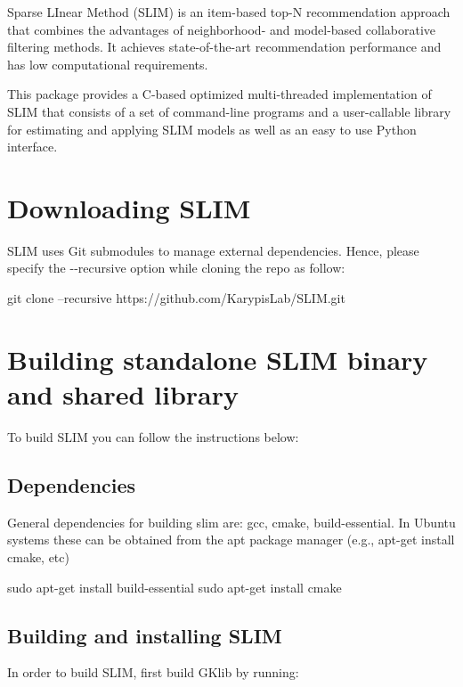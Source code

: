 Sparse L\+Inear Method (S\+L\+IM) \cite{ning2011slim} is an item-\/based top-\/N recommendation approach that combines the advantages of neighborhood-\/ and model-\/based collaborative filtering methods. It achieves state-\/of-\/the-\/art recommendation performance and has low computational requirements.

This package provides a C-\/based optimized multi-\/threaded implementation of S\+L\+IM that consists of a set of command-\/line programs and a user-\/callable library for estimating and applying S\+L\+IM models as well as an easy to use Python interface.



 \hypertarget{index_download}{}\section{Downloading S\+L\+IM}\label{index_download}
S\+L\+IM uses Git submodules to manage external dependencies. Hence, please specify the {\ttfamily -\/-\/recursive} option while cloning the repo as follow\+: 
\begin{DoxyCode}
git clone --recursive https://github.com/KarypisLab/SLIM.git
\end{DoxyCode}
\hypertarget{index_installation}{}\section{Building standalone S\+L\+I\+M binary and shared library}\label{index_installation}
To build S\+L\+IM you can follow the instructions below\+:\hypertarget{index_deps}{}\subsection{Dependencies}\label{index_deps}
General dependencies for building slim are\+: gcc, cmake, build-\/essential. In Ubuntu systems these can be obtained from the apt package manager (e.\+g., apt-\/get install cmake, etc)

\begin{DoxyVerb}sudo apt-get install build-essential
sudo apt-get install cmake
\end{DoxyVerb}
\hypertarget{index_without_mkl}{}\subsection{Building and installing S\+L\+IM}\label{index_without_mkl}
In order to build S\+L\+IM, first build G\+Klib by running\+:

